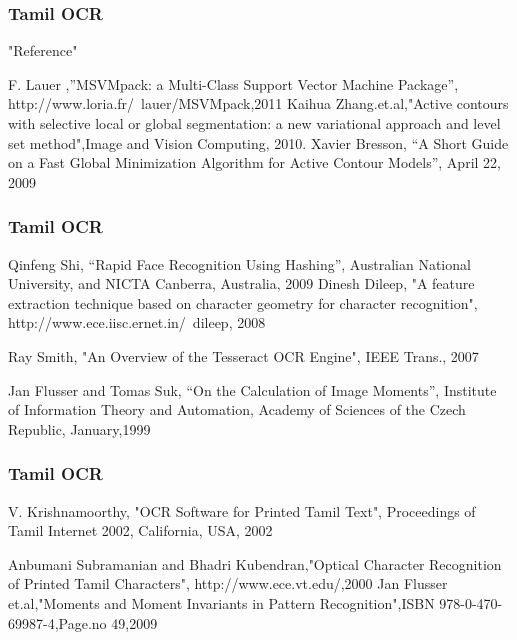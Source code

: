 \documentclass{beamer}
\begin{document}


\begin{frame}
  \frametitle{Tamil OCR}
  "Reference"
\begin{thebibliography}{10}
F. Lauer ,”MSVMpack: a Multi-Class Support Vector Machine Package”, http://www.loria.fr/~lauer/MSVMpack,2011
   Kaihua Zhang.et.al,"Active contours with selective local or global segmentation: a new variational approach and
   level set method",Image and Vision Computing, 2010. 
  Xavier Bresson, “A Short Guide on a Fast Global Minimization Algorithm for Active Contour Models”, April 22, 2009
\end{thebibliography}
\end{frame}


\begin{frame}
  \frametitle{Tamil OCR}
\begin{thebibliography}{10}

Qinfeng Shi, “Rapid Face Recognition Using Hashing”, Australian National University, and NICTA
      Canberra, Australia, 2009
Dinesh Dileep, "A feature extraction technique based on character geometry for character recognition", http://www.ece.iisc.ernet.in/~dileep, 2008

Ray Smith, "An Overview of the Tesseract OCR Engine", IEEE Trans., 2007


Jan Flusser and Tomas Suk, “On the Calculation of Image Moments”, Institute of Information Theory and Automation, Academy of Sciences of the Czech Republic, January,1999
\end{thebibliography}
\end{frame}

\begin{frame}
  \frametitle{Tamil OCR}
\begin{thebibliography}{10}

V. Krishnamoorthy, "OCR Software for Printed Tamil Text", 
Proceedings of Tamil Internet 2002, California, USA, 2002

Anbumani Subramanian and Bhadri Kubendran,"Optical Character Recognition of Printed Tamil Characters",
http://www.ece.vt.edu/,2000
Jan Flusser et.al,"Moments and Moment Invariants in Pattern Recognition",ISBN 978-0-470-69987-4,Page.no 49,2009

\end{thebibliography}
\end{frame}
\end{document}
